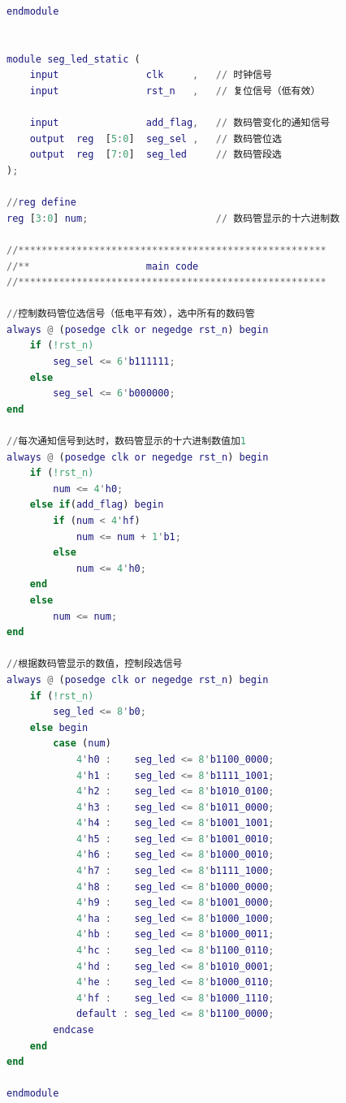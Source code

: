 \documentclass[UTF8]{article}
\theoremstyle{MyLineTheoremStyle} %
\theoremstyle{MyBlockTheoremStyle} %
\theoremstyle{MySubsubsectionStyle} %
\begin{document}
\begin{lstlisting}[language=Matlab, style=MatlabStyle_src]
endmodule 


module seg_led_static (
    input               clk     ,   // 时钟信号
    input               rst_n   ,   // 复位信号（低有效）

    input               add_flag,   // 数码管变化的通知信号
    output  reg  [5:0]  seg_sel ,   // 数码管位选
    output  reg  [7:0]  seg_led     // 数码管段选
);

//reg define
reg [3:0] num;                      // 数码管显示的十六进制数

//*****************************************************
//**                    main code
//*****************************************************

//控制数码管位选信号（低电平有效），选中所有的数码管
always @ (posedge clk or negedge rst_n) begin
    if (!rst_n)
        seg_sel <= 6'b111111;
    else
        seg_sel <= 6'b000000;
end

//每次通知信号到达时，数码管显示的十六进制数值加1
always @ (posedge clk or negedge rst_n) begin
    if (!rst_n)
        num <= 4'h0;
    else if(add_flag) begin
        if (num < 4'hf)
            num <= num + 1'b1;
        else
            num <= 4'h0;
    end
    else
        num <= num;
end

//根据数码管显示的数值，控制段选信号
always @ (posedge clk or negedge rst_n) begin
    if (!rst_n)
        seg_led <= 8'b0;
    else begin
        case (num)
            4'h0 :    seg_led <= 8'b1100_0000;
            4'h1 :    seg_led <= 8'b1111_1001;
            4'h2 :    seg_led <= 8'b1010_0100;
            4'h3 :    seg_led <= 8'b1011_0000;
            4'h4 :    seg_led <= 8'b1001_1001;
            4'h5 :    seg_led <= 8'b1001_0010;
            4'h6 :    seg_led <= 8'b1000_0010;
            4'h7 :    seg_led <= 8'b1111_1000;
            4'h8 :    seg_led <= 8'b1000_0000;
            4'h9 :    seg_led <= 8'b1001_0000;
            4'ha :    seg_led <= 8'b1000_1000;
            4'hb :    seg_led <= 8'b1000_0011;
            4'hc :    seg_led <= 8'b1100_0110;
            4'hd :    seg_led <= 8'b1010_0001;
            4'he :    seg_led <= 8'b1000_0110;
            4'hf :    seg_led <= 8'b1000_1110;
            default : seg_led <= 8'b1100_0000;
        endcase
    end
end

endmodule 

\end{lstlisting}


\cleardoublepage
\end{document}
